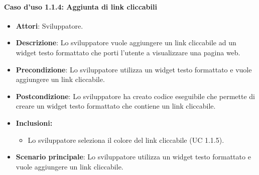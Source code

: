 \paragraph{Caso d'uso 1.1.4: Aggiunta di link cliccabili}
\begin{itemize}
\item\textbf{Attori}: Sviluppatore.
\item\textbf{Descrizione}: Lo sviluppatore vuole aggiungere un link cliccabile ad un widget testo formattato che porti l'utente a visualizzare una pagina web.
\item\textbf{Precondizione}: Lo sviluppatore utilizza un widget testo formattato e vuole aggiungere un link cliccabile.
\item\textbf{Postcondizione}: Lo sviluppatore ha creato codice eseguibile che permette di creare un widget testo formattato che contiene un link cliccabile.

\item\textbf{Inclusioni:}
	\begin{itemize}
		\item Lo sviluppatore seleziona il colore del link cliccabile (UC 1.1.5).
	\end{itemize}

\item\textbf{Scenario principale}: Lo sviluppatore utilizza un widget testo formattato e vuole aggiungere un link cliccabile.
\end{itemize}